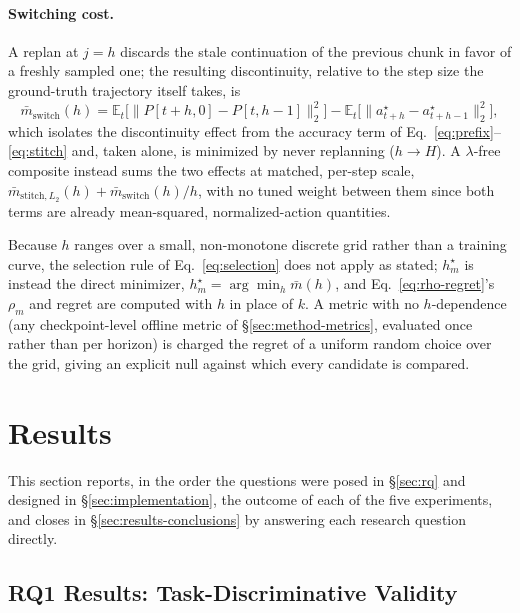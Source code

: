 \documentclass[english,12pt,a4paper,pdftex,elec,utf8]{aaltothesis}
\begin{document}
\paragraph{Switching cost.} A replan at $j{=}h$ discards the stale continuation of the previous chunk in favor of a freshly sampled one; the resulting discontinuity, relative to the step size the ground-truth trajectory itself takes, is
\begin{equation}
  \bar m_{\mathrm{switch}}(h) = \mathbb E_t\Big[\big\lVert P[t{+}h,0]-P[t,h{-}1]\big\rVert_2^2\Big]
  - \mathbb E_t\Big[\big\lVert a^\star_{t+h}-a^\star_{t+h-1}\big\rVert_2^2\Big],
  \label{eq:switch}
\end{equation}
which isolates the discontinuity effect from the accuracy term of Eq.~\ref{eq:prefix}--\ref{eq:stitch} and, taken alone, is minimized by never replanning ($h{\to}H$). A $\lambda$-free composite instead sums the two effects at matched, per-step scale, $\bar m_{\mathrm{stitch},L_2}(h) + \bar m_{\mathrm{switch}}(h)/h$, with no tuned weight between them since both terms are already mean-squared, normalized-action quantities.

Because $h$ ranges over a small, non-monotone discrete grid rather than a training curve, the selection rule of Eq.~\ref{eq:selection} does not apply as stated; $h_m^\star$ is instead the direct minimizer, $h_m^\star=\arg\min_h \bar m(h)$, and Eq.~\ref{eq:rho-regret}'s $\rho_m$ and regret are computed with $h$ in place of $k$. A metric with no $h$-dependence (any checkpoint-level offline metric of \S\ref{sec:method-metrics}, evaluated once rather than per horizon) is charged the regret of a uniform random choice over the grid, giving an explicit null against which every candidate is compared.

\clearpage

\section{Results}
\label{sec:results}

This section reports, in the order the questions were posed in \S\ref{sec:rq} and designed in \S\ref{sec:implementation}, the outcome of each of the five experiments, and closes in \S\ref{sec:results-conclusions} by answering each research question directly.

\subsection{RQ1 Results: Task-Discriminative Validity}
\label{sec:results-taskdisc}
\end{document}
